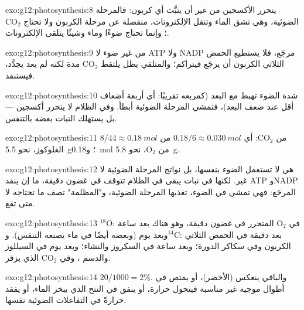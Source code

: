 \begin{solution}{exo:g12:photosynthesis:8}
يتحرر الأكسجين من غير أن يثبَّت أي كربون: فالمرحلة الضوئية، وهي تشق
الماء وتنقل الإلكترونات، منفصلة عن مرحلة الكربون ولا تحتاج
$\mathrm{CO_2}$؛ وإنما تحتاج ضوءًا وماء وشيئًا يتلقى الإلكترونات.
\end{solution}

\begin{solution}{exo:g12:photosynthesis:9}
من غير ضوء لا ATP ولا NADP مرجَع، فلا يستطيع الحمض الثلاثي الكربون أن
يرجَع فيتراكم؛ والمتلقي يظل يلتقط $\mathrm{CO_2}$ مدة لكنه لم يعد
يجدَّد، فيستنفد.
\end{solution}

\begin{solution}{exo:g12:photosynthesis:10}
شدة الضوء تهبط مع البعد (كمربعه تقريبًا: أي أربعة أضعاف أقل عند ضعف
البعد)، فتمشي المرحلة الضوئية أبطأ. وفي الظلام لا يتحرر أكسجين ---
بل يستهلك النبات بعضه بالتنفس.
\end{solution}

\begin{solution}{exo:g12:photosynthesis:11}
$8/44 \approx \qty{0.18}{mol}$ من $\mathrm{CO_2}$: أي $0.18/6 \approx
\qty{0.030}{mol}$ من الغلوكوز، نحو \qty{5.5}{g}؛ و\qty{0.18}{mol} من
$\mathrm{O_2}$، نحو \qty{5.8}{g}.
\end{solution}

\begin{solution}{exo:g12:photosynthesis:12}
هي لا تستعمل الضوء بنفسها، بل نواتج المرحلة الضوئية لا غير. لكنها في
نبات يبقى في الظلام تتوقف في غضون دقيقة، ما إن ينفد ATP وNADP المرجَع:
فهي تمشي في الضوء، تغذيها المرحلة الضوئية، و"المظلمة" تصف ما تحتاجه لا
متى تقع.
\end{solution}

\begin{solution}{exo:g12:photosynthesis:13}
$^{18}$O: في $\mathrm{O_2}$ المتحرر في غضون دقيقة، وهو هناك بعد ساعة
وبعد يوم (وبعضه أيضًا في ماء يصنعه التنفس).
و$^{14}$C: بعد دقيقة في الحمض الثلاثي الكربون وفي سكاكر الدورة؛ وبعد
ساعة في السكروز والنشاء؛ وبعد يوم في السيللوز والدسم ،
وفي $\mathrm{CO_2}$ الذي يزفر.
\end{solution}

\begin{solution}{exo:g12:photosynthesis:14}
$20/1000 = 2\%$. والباقي ينعكس (الأخضر)، أو يمتص في أطوال موجية غير
مناسبة فيتحول حرارة، أو ينفق في النتح الذي يبخر الماء، أو يفقد حرارةً
في التفاعلات الضوئية نفسها.
\end{solution}

